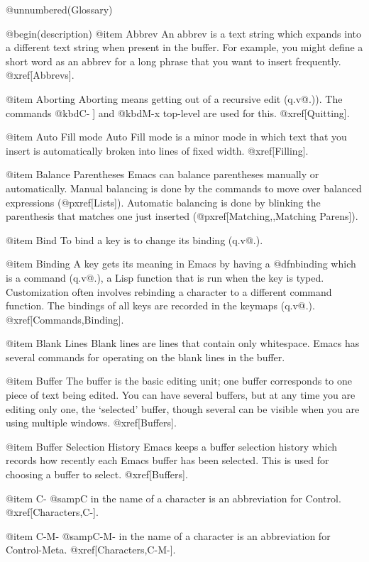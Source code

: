 
@unnumbered(Glossary)

@begin(description)
@item Abbrev
An abbrev is a text string which expands into a different text string when
present in the buffer.  For example, you might define a short word as an
abbrev for a long phrase that you want to insert frequently.  @xref[Abbrevs].

@item Aborting
Aborting means getting out of a recursive edit (q.v@.)).  The commands
@kbd{C-]} and @kbd{M-x top-level} are used for this.  @xref[Quitting]. 

@item Auto Fill mode
Auto Fill mode is a minor mode in which text that you insert is
automatically broken into lines of fixed width.  @xref[Filling].

@item Balance Parentheses
Emacs can balance parentheses manually or automatically.
Manual balancing is done by the commands to move over balanced
expressions (@pxref[Lists]).  Automatic balancing is done by
blinking the parenthesis that matches one just inserted
(@pxref[Matching,,Matching Parens]).

@item Bind
To bind a key is to change its binding (q.v@.).

@item Binding
A key gets its meaning in Emacs by having a @dfn{binding} which is a
command (q.v@.), a Lisp function that is run when the key is typed.
Customization often involves rebinding a character to a different
command function.  The bindings of all keys are recorded in the
keymaps (q.v@.).  @xref[Commands,Binding].

@item Blank Lines
Blank lines are lines that contain only whitespace.
Emacs has several commands for operating on the blank lines in
the buffer.

@item Buffer
The buffer is the basic editing unit; one buffer corresponds to one piece
of text being edited.  You can have several buffers, but at any time you
are editing only one, the `selected' buffer, though several can be visible
when you are using multiple windows.  @xref[Buffers].

@item Buffer Selection History
Emacs keeps a buffer selection history which records how recently each
Emacs buffer has been selected.  This is used for choosing a buffer to
select.  @xref[Buffers].

@item C-
@samp{C} in the name of a character is an abbreviation for Control.
@xref[Characters,C-].

@item C-M-
@samp{C-M-} in the name of a character is an abbreviation for
Control-Meta.  @xref[Characters,C-M-].

